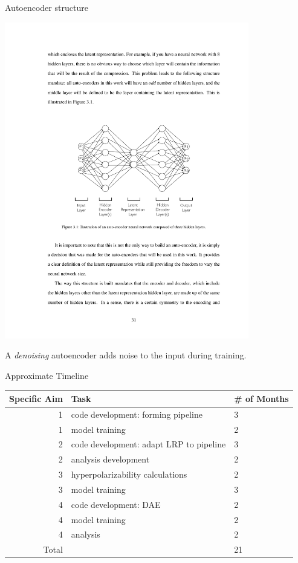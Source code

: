\documentclass[xetex,compress]{beamer}
\begin{document}
\begin{frame}{Autoencoder structure}
  \begin{center}
    \includegraphics[width=0.80\textwidth]{./figures/autoencoder.pdf}
  \end{center}
  A \textit{denoising} autoencoder adds noise to the input during training.
\end{frame}

\begin{frame}{Approximate Timeline}
\begin{table}[]
\centering
\begin{tabular}{@{}rp{}l@{}}
\toprule
Specific Aim & Task                                    & \# of Months \\ \midrule
1            & code development: forming pipeline      & 3            \\
1            & model training                          & 2            \\
2            & code development: adapt LRP to pipeline & 3            \\
2            & analysis development                    & 2            \\
3            & hyperpolarizability calculations        & 2            \\
3            & model training                          & 3            \\
4            & code development: DAE                   & 2            \\
4            & model training                          & 2            \\
4            & analysis                                & 2            \\ \midrule
Total        &                                         & 21           \\ \bottomrule
\end{tabular}
\end{table}\end{frame}
\end{document}
